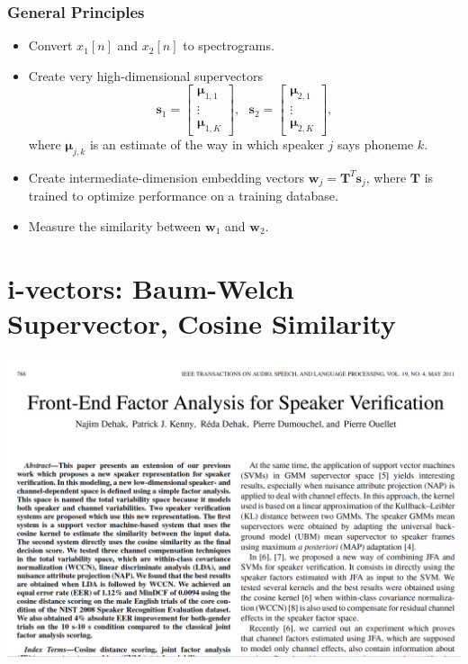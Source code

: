 \documentclass{beamer}
\begin{document}
\begin{frame}
  \frametitle{General Principles}

  \begin{itemize}
  \item Convert $x_1[n]$ and $x_2[n]$ to spectrograms.
  \item Create very high-dimensional supervectors
    \begin{displaymath}
      \bm{s}_1=\left[\begin{array}{c}\bm{\mu}_{1,1}\\\vdots\\\bm{\mu}_{1,K}\end{array}\right],~~~
      \bm{s}_2=\left[\begin{array}{c}\bm{\mu}_{2,1}\\\vdots\\\bm{\mu}_{2,K}\end{array}\right],
    \end{displaymath}
    where $\bm{\mu}_{j,k}$ is an estimate of the way in which speaker $j$ says phoneme $k$.
  \item Create intermediate-dimension embedding vectors
    $\bm{w}_j=\bm{T}^T\bm{s}_j$, where $\bm{T}$ is trained to optimize
    performance on a training database.
  \item Measure the similarity between $\bm{w}_1$ and $\bm{w}_2$.
  \end{itemize}
\end{frame}

\section[i-vectors]{i-vectors: Baum-Welch Supervector, Cosine Similarity}
\setcounter{subsection}{1}

\begin{frame}
  \centerline{\includegraphics[width=\textwidth]{figs/dehak2011page1.png}}
\end{frame}
\end{document}
